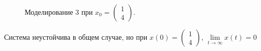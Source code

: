 \documentclass[a5paper, 10pt]{article}
\theoremstyle{definition}
\theoremstyle{plain}
\theoremstyle{remark}
\begin{document}
\begin{figure}[h!]
\caption{Моделирование 3 при  $ x_0 = \begin{pmatrix} 1 \\ 4 \end{pmatrix}$.}
\end{figure}
\newpage
Система неустойчива в общем случае, но при $x(0) = \begin{pmatrix} 1 \\ 4 \end{pmatrix}$,  $\lim\limits_{t \to \infty} x(t) = 0$


\newpage
\end{document}
